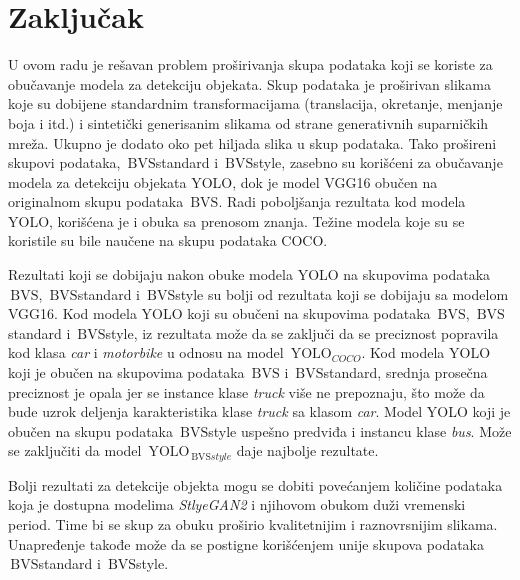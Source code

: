 \documentclass[12pt,oneside]{memoir}
\newcommand{\yolo}{\ensuremath{\,\textrm{YOLO}}}
\newcommand{\bvs}{\ensuremath{\,\textrm{BVS}}}
\begin{document}


\clearpage
\chapter{Zaključak}
\label{section6}
U ovom radu je rešavan problem proširivanja skupa podataka koji se koriste za obučavanje modela za detekciju objekata. Skup podataka je proširivan slikama koje su dobijene standardnim transformacijama (translacija, okretanje, menjanje boja i itd.) i sintetički generisanim slikama od strane generativnih suparničkih mreža. Ukupno je dodato oko pet hiljada slika u skup podataka. Tako prošireni skupovi podataka, \bvs{standard} i \bvs{style}, zasebno su korišćeni za obučavanje modela za detekciju objekata YOLO, dok je model VGG16 obučen na originalnom skupu podataka \bvs.
Radi poboljšanja rezultata kod modela YOLO, korišćena je i obuka sa prenosom znanja. Težine modela koje su se koristile su bile naučene na skupu podataka COCO.

Rezultati koji se dobijaju nakon obuke modela YOLO na skupovima podataka \bvs, \bvs{standard} i \bvs{style} su bolji od rezultata koji se dobijaju sa modelom VGG16. Kod modela YOLO koji su obučeni na skupovima podataka \bvs, \bvs{standard} i \bvs{style}, iz rezultata može da se zaključi da se preciznost popravila kod klasa \textit{car} i \textit{motorbike} u odnosu na model $\yolo_{COCO}$. Kod modela YOLO koji je obučen na skupovima podataka \bvs{} i \bvs{standard}, srednja prosečna preciznost je opala jer se instance klase \textit{truck} više ne prepoznaju, što može da bude uzrok deljenja karakteristika klase \textit{truck} sa klasom \textit{car}. Model YOLO koji je obučen na skupu podataka \bvs{style} uspešno predviđa i instancu klase \textit{bus}. Može se zaključiti da model $\yolo_{\bvs{style}}$ daje najbolje rezultate.

Bolji rezultati za detekcije objekta mogu se dobiti povećanjem količine podataka koja je dostupna modelima \textit{StlyeGAN2} i njihovom obukom duži vremenski period. Time bi se skup za obuku proširio kvalitetnijim i raznovrsnijim slikama.
Unapređenje takođe može da se postigne korišćenjem unije skupova podataka \bvs{standard} i \bvs{style}.
\end{document}
